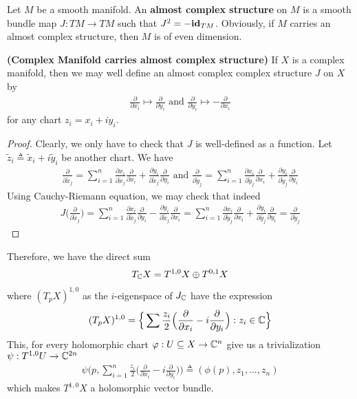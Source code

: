 \documentclass{report}
\begin{document}
Let $M$ be a smooth manifold. An \textbf{almost complex structure} on $M$ is a smooth bundle map $J:TM \rightarrow TM$ such that $J^2=-\text{\textbf{id}} _{TM}$. Obviously, if $M$ carries an almost complex structure, then $M$ is of even dimension. 
\begin{theorem}
\textbf{(Complex Manifold carries almost complex structure)} If $X$ is a complex manifold, then we may well define an almost complex complex structure $J$ on  $X$ by 
 \begin{align*}
   \frac{\partial }{\partial x_i}\mapsto \frac{\partial }{\partial y_i}\text{ and }\frac{\partial }{\partial y_i}\mapsto -\frac{\partial }{\partial x_i}
\end{align*}
for any chart $z_i=x_i + i y_i$. 
\end{theorem}
\begin{proof}
Clearly, we only have to check that $J$ is well-defined as a function. Let $\tilde{z}_i\triangleq \tilde{x}_i+i  \tilde{y}_i$ be another chart. We have 
\begin{align*}
\frac{\partial }{\partial \tilde{x}_j }= \sum_{i=1}^{n} \frac{\partial x_i}{\partial \tilde{x}_j } \frac{\partial }{\partial x_i}+ \frac{\partial y_i}{\partial \tilde{x}_j } \frac{\partial }{\partial y_i} \text{ and } \frac{\partial }{\partial \tilde{y}_j }= \sum_{i=1}^n \frac{\partial x_i}{\partial \tilde{y}_j } \frac{\partial }{\partial x_i} + \frac{\partial y_i}{\partial \tilde{y}_j } \frac{\partial }{\partial y_i}
\end{align*}
Using Cauchy-Riemann equation, we may check that indeed
\begin{align*}
  J\Big(\frac{\partial }{\partial \tilde{x}_j } \Big)= \sum_{i=1}^n \frac{\partial x_i}{\partial \tilde{x}_j } \frac{\partial }{\partial y_i}- \frac{\partial y_i}{\partial \tilde{x}_j } \frac{\partial }{\partial x_i}= \sum_{i=1}^n  \frac{\partial x_i}{\partial \tilde{y}_j } \frac{\partial }{\partial x_i}+ \frac{\partial y_i}{\partial \tilde{y_j} } \frac{\partial }{\partial y_i}=  \frac{\partial }{\partial \tilde{y}_j } 
\end{align*}
\end{proof}
Therefore, we have the direct sum 
\begin{align*}
T_{\mathbb{C}} X = T^{1,0}X \oplus  T^{0,1}X
\end{align*}
where $(T_pX)^{1,0}$ as the $i$-eigenspace of $J_{\mathbb{C}}$ have the expression    
\begin{align*}
  (T_pX)^{1,0}= \Big\{  \sum \frac{z_i}{2}\Big(\frac{\partial }{\partial x_i}- i \frac{\partial }{\partial y_i}\Big) :z_i \in\mathbb{C}  \Big\}  
\end{align*}
This, for every holomorphic chart $\varphi : U\subseteq X\rightarrow \mathbb{C}^n$ give us a trivialization $\psi:T^{1,0}U\rightarrow \mathbb{C}^{2n}$
\begin{align*}
\psi \Big(p,\sum_{i=1}^n \frac{z_i}{2}\Big(\frac{\partial }{\partial x_i}- i \frac{\partial }{\partial y_i}\Big) \Big)\triangleq (\phi (p), z_1,\dots ,z_n)
\end{align*}
which makes $T^{1,0}X$ a holomorphic vector bundle. 
\end{document}
